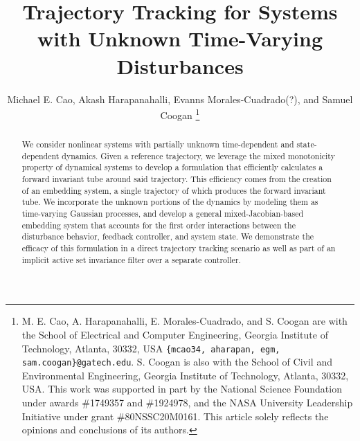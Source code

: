 \documentclass[preprint,12pt]{elsarticle}
\begin{document}
\begin{frontmatter}
\title{\LARGE \bf Trajectory Tracking for Systems with Unknown Time-Varying Disturbances}
\author{Michael E. Cao, Akash Harapanahalli, Evanns Morales-Cuadrado(?), and Samuel Coogan%
\thanks{M. E. Cao, A. Harapanahalli, E. Morales-Cuadrado, and S. Coogan are with the School of Electrical and Computer Engineering, Georgia Institute of Technology, Atlanta, 30332, USA {\tt\small \{mcao34, aharapan, egm, sam.coogan\}@gatech.edu}. S. Coogan is also with the School of Civil and Environmental Engineering, Georgia Institute of Technology, Atlanta, 30332, USA.
This work was supported in part by the National Science Foundation under awards \#1749357 and \#1924978, and the NASA University Leadership Initiative under grant \#80NSSC20M0161. This article solely reflects the opinions and conclusions of its authors.
}
}







\begin{abstract}

We consider nonlinear systems with partially unknown time-dependent and state-dependent dynamics. Given a reference trajectory, we leverage the mixed monotonicity property of dynamical systems to develop a formulation that efficiently calculates a forward invariant tube around said trajectory. This efficiency comes from the creation of an embedding system, a single trajectory of which produces the forward invariant tube. We incorporate the unknown portions of the dynamics by modeling them as time-varying Gaussian processes, and develop a general mixed-Jacobian-based embedding system that accounts for the first order interactions between the disturbance behavior, feedback controller, and system state. We demonstrate the efficacy of this formulation in a direct trajectory tracking scenario as well as part of an implicit active set invariance filter over a separate controller.

\end{abstract}

\end{frontmatter}
\end{document}
